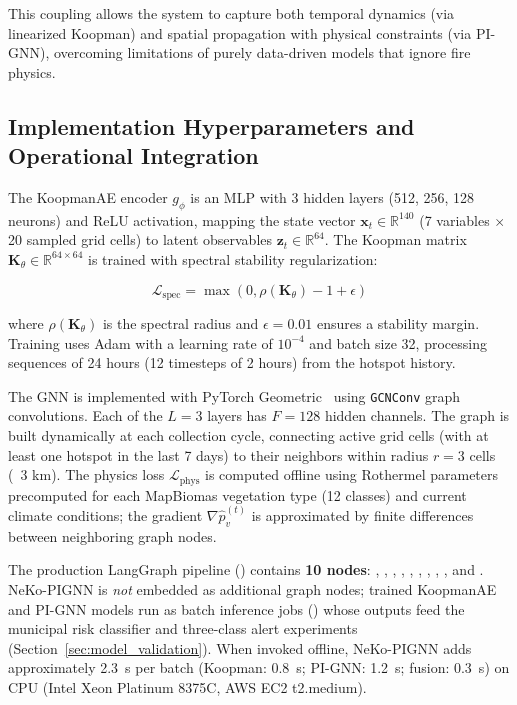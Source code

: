 \documentclass[preprint,12pt,times,numbers]{elsarticle}
\begin{document}
This coupling allows the system to capture both temporal dynamics (via linearized Koopman) and spatial propagation with physical constraints (via PI-GNN), overcoming limitations of purely data-driven models that ignore fire physics.

\subsection{Implementation Hyperparameters and Operational Integration}
\label{sec:impl-details}

The KoopmanAE encoder $g_\phi$ is an MLP with 3 hidden layers (512, 256, 128 neurons) and ReLU activation, mapping the state vector $\mathbf{x}_t \in \mathbb{R}^{140}$ (7 variables $\times$ 20 sampled grid cells) to latent observables $\mathbf{z}_t \in \mathbb{R}^{64}$. The Koopman matrix $\mathbf{K}_\theta \in \mathbb{R}^{64 \times 64}$ is trained with spectral stability regularization:

\begin{equation}
\mathcal{L}_{\text{spec}} = \max(0, \rho(\mathbf{K}_\theta) - 1 + \epsilon)
\label{eq:spectral_reg}
\end{equation}

where $\rho(\mathbf{K}_\theta)$ is the spectral radius and $\epsilon = 0.01$ ensures a stability margin. Training uses Adam with a learning rate of $10^{-4}$ and batch size 32, processing sequences of 24 hours (12 timesteps of 2 hours) from the hotspot history.

The GNN is implemented with PyTorch Geometric~\cite{article:pyg2019} using \texttt{GCNConv} graph convolutions. Each of the $L = 3$ layers has $F = 128$ hidden channels. The graph is built dynamically at each collection cycle, connecting active grid cells (with at least one hotspot in the last 7 days) to their neighbors within radius $r = 3$ cells (~3 km). The physics loss $\mathcal{L}_{\text{phys}}$ is computed offline using Rothermel parameters precomputed for each MapBiomas vegetation type (12 classes) and current climate conditions; the gradient $\nabla \hat{p}_v^{(t)}$ is approximated by finite differences between neighboring graph nodes.

The production LangGraph pipeline () contains \textbf{10 nodes}: , , , , , , , , , and . NeKo-PIGNN is \emph{not} embedded as additional graph nodes; trained KoopmanAE and PI-GNN models run as batch inference jobs () whose outputs feed the municipal risk classifier and three-class alert experiments (Section~\ref{sec:model_validation}). When invoked offline, NeKo-PIGNN adds approximately 2.3~s per batch (Koopman: 0.8~s; PI-GNN: 1.2~s; fusion: 0.3~s) on CPU (Intel Xeon Platinum 8375C, AWS EC2 t2.medium).
\end{document}
